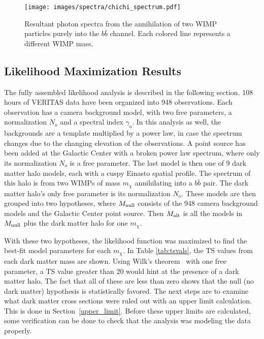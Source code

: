   \begin{figure}[bt]
    \centering
    \texttt{[image: images/spectra/chichi\_spectrum.pdf]}
    \caption[Single Annihilation Spectra]{
      Resultant photon spectra from the annihilation of two WIMP particles purely into the $b\bar{b}$ channel.
      Each colored line represents a different WIMP mass.
    }
    \label{fig:chichi_spectrum2}
  \end{figure}

  \FloatBarrier

  \subsection{Likelihood Maximization Results}\label{like_results}

  The fully assembled likelihood analysis is described in the following section.
  108 hours of VERITAS data have been organized into 948 observations.
  Each observation has a camera background model, with two free parameters, a normalization $N_o$ and a spectral index $\gamma_o$.
  In this analysis as well, the backgrounds are a template multiplied by a power law, in case the spectrum changes due to the changing elevation of the observations.
  A point source has been added at the Galactic Center with a broken power law spectrum, where only its normalization $N_o$ is a free parameter.
  The last model is then one of 9 dark matter halo models, each with a cuspy Einasto spatial profile.
  The spectrum of this halo is from two WIMPs of mass $m_{\chi}$ annihilating into a $b\bar{b}$ pair.
  The dark matter halo's only free parameter is its normalization $N_o$.
  These models are then grouped into two hypotheses, where $M_\textrm{null}$ consists of the 948 camera background models and the Galactic Center point source.
  Then $M_\textrm{alt}$ is all the models in $M_\textrm{null}$ plus the dark matter halo for one $m_{\chi}$.
  
  With these two hypotheses, the likelihood function was maximized to find the best-fit model parameters for each $m_{\chi}$.
  In Table \ref{tab:tsvals}, the TS values from each dark matter mass are shown.
  Using Wilk's theorem~\cite{wilks1938} with one free parameter, a TS value greater than 20 would hint at the presence of a dark matter halo.
  The fact that all of these are less than zero shows that the null (no dark matter) hypothesis is statistically favored.
  The next steps are to examine what dark matter cross sections were ruled out with an upper limit calculation.
  This is done in Section~\ref{upper_limit}.
  Before these upper limits are calculated, some verification can be done to check that the analysis was modeling the data properly.

